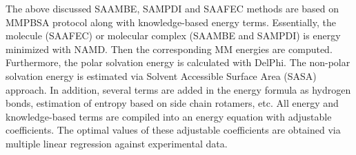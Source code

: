 \documentclass[9pt,tutorial]{livecoms}
\begin{document}
The above discussed SAAMBE, SAMPDI and SAAFEC methods are based on MMPBSA protocol along with knowledge-based energy terms. Essentially, the molecule (SAAFEC) or molecular complex (SAAMBE and SAMPDI) is energy minimized with NAMD. Then the corresponding MM energies are computed. Furthermore, the polar solvation energy is calculated with DelPhi. The non-polar solvation energy is estimated via Solvent Accessible Surface Area (SASA) approach. In addition, several terms are added in the energy formula as hydrogen bonds, estimation of entropy based on side chain rotamers, etc. All energy and knowledge-based terms are compiled into an energy equation with adjustable coefficients. The optimal values of these adjustable coefficients are obtained via multiple linear regression against experimental data\cite{petukh2016saambe,peng2017predicting,getov2016saafec}.
\end{document}

